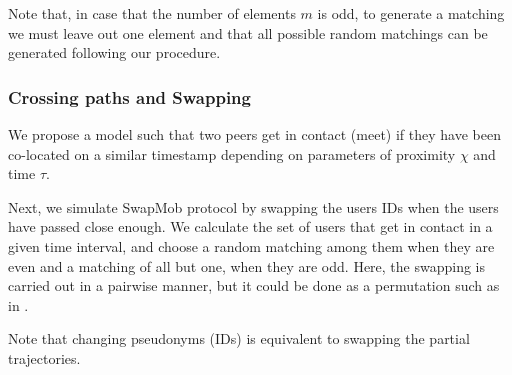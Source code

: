 \documentclass{llncs}
\begin{document}
Note that, in case that the number of elements $m$ is odd, to generate a matching we must leave out one element and that all possible random matchings can be generated following our procedure.

\subsubsection{Crossing paths and Swapping} \label{sec:cross}
We propose a model such that two peers get in contact (meet) if they have been co-located on a similar timestamp depending on parameters of proximity $\chi$ and time $\tau$.


Next, we simulate SwapMob protocol by swapping the users IDs when the users have passed close enough.
We calculate the set of users that get in contact in a given time interval, and choose a random matching among them when they are even and a matching of all but one, when they are odd.
Here, the swapping is carried out in a pairwise manner, but it could be done as a permutation such as in \cite{Beresford04mixzones}.

Note that changing pseudonyms (IDs) is equivalent to swapping the partial trajectories.


\begin{figure}[!t]
\end{figure}   	
   	
\end{document}
